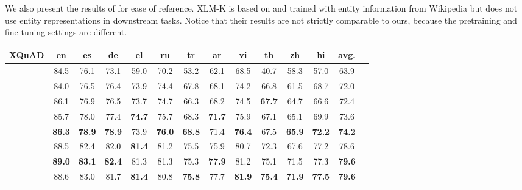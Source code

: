 \documentclass[11pt]{article}
\begin{document}
We also present the results of {\bf \xlmk{}} \citep{XLM-K-2021-arxiv} for ease of reference.
XLM-K is based on \xlmr{}\ba{} and trained with entity information from Wikipedia but does not use entity representations in downstream tasks.
Notice that their results are not strictly comparable to ours, because the pretraining and fine-tuning settings are different.
 \begin{table*}[ht]
   \small
\begin{tabular}{lccccccccccccc} \toprule
    XQuAD  &   en & es & de & el & ru & tr & ar & vi & th & zh & hi & avg. \\
  \midrule
  \mbert{} & 84.5 & 76.1 & 73.1 & 59.0 & 70.2 & 53.2 & 62.1 & 68.5 & 40.7 & 58.3 & 57.0 & 63.9 \\
  \xlmr{}\ba{} & 84.0 & 76.5 & 76.4 & 73.9 & 74.4 & 67.8 & 68.1 & 74.2 & 66.8 & 61.5 & 68.7 & 72.0 \\
  \extraTraining{} & 86.1 & 76.9 & 76.5 & 73.7 & 74.7 & 66.3 & 68.2 & 74.5 & {\bf 67.7} & 64.7 & 66.6 & 72.4 \\
  \mlukeW{}\ba{} & 85.7 & 78.0 & 77.4 & {\bf 74.7} & 75.7 & 68.3 & {\bf 71.7} & 75.9 & 67.1 & 65.1 & 69.9 & 73.6 \\
  \mlukeE{}\ba{} & {\bf 86.3} & {\bf 78.9} & {\bf 78.9} & 73.9 & {\bf 76.0} & {\bf 68.8} & 71.4 & {\bf 76.4} & 67.5 & {\bf 65.9} & {\bf 72.2} & {\bf 74.2} \\
  \midrule

  \xlmr{}\la{} &  88.5 & 82.4 & 82.0 & {\bf 81.4} & 81.2 & 75.5 & 75.9 & 80.7 & 72.3 & 67.6 & 77.2 & 78.6 \\
  \mlukeW{}\la{} & {\bf 89.0} & {\bf 83.1} & {\bf 82.4} & 81.3 & 81.3 & 75.3 & {\bf 77.9} & 81.2 & 75.1 & 71.5 & 77.3 & {\bf 79.6} \\
  \mlukeE{}\la{} & 88.6 & 83.0 & 81.7 & {\bf 81.4} & 80.8 & {\bf 75.8} & 77.7 & {\bf 81.9} & {\bf 75.4} & {\bf 71.9} & {\bf 77.5} & {\bf 79.6} \\
  
  \bottomrule
  \end{tabular}


\end{table*}
\end{document}
